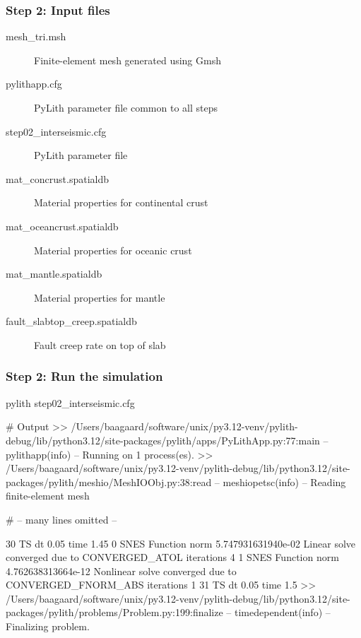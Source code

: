 \documentclass[aspectratio=169]{beamer}
\begin{document}
\begin{frame}
  \frametitle{Step 2: Input files}
  \summary{}

  \begin{description}
  \item[mesh\_tri.msh] Finite-element mesh generated using Gmsh
  \item[pylithapp.cfg] PyLith parameter file common to all steps
  \item[step02\_interseismic.cfg] PyLith parameter file
  \item[mat\_concrust.spatialdb] Material properties for continental crust
  \item[mat\_oceancrust.spatialdb] Material properties for oceanic crust
  \item[mat\_mantle.spatialdb] Material properties for mantle
  \item[fault\_slabtop\_creep.spatialdb] Fault creep rate on top of slab
  \end{description}
    
\end{frame}


\begin{frame}[fragile]
  \frametitle{Step 2: Run the simulation}
  \summary{}

\begin{bashcode}
pylith step02_interseismic.cfg

# Output
 >> /Users/baagaard/software/unix/py3.12-venv/pylith-debug/lib/python3.12/site-packages/pylith/apps/PyLithApp.py:77:main
 -- pylithapp(info)
 -- Running on 1 process(es).
 >> /Users/baagaard/software/unix/py3.12-venv/pylith-debug/lib/python3.12/site-packages/pylith/meshio/MeshIOObj.py:38:read
 -- meshiopetsc(info)
 -- Reading finite-element mesh

# -- many lines omitted --

30 TS dt 0.05 time 1.45
    0 SNES Function norm 5.747931631940e-02
      Linear solve converged due to CONVERGED_ATOL iterations 4
    1 SNES Function norm 4.762638313664e-12
    Nonlinear solve converged due to CONVERGED_FNORM_ABS iterations 1
31 TS dt 0.05 time 1.5
 >> /Users/baagaard/software/unix/py3.12-venv/pylith-debug/lib/python3.12/site-packages/pylith/problems/Problem.py:199:finalize
 -- timedependent(info)
 -- Finalizing problem.
\end{bashcode}
  
\end{frame}
\end{document}
